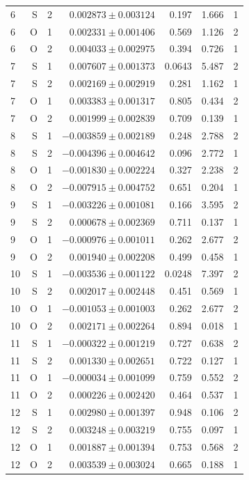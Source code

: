 {\begin{longtable}{lrrrrrr}
6 & S & 2 & $0.002873\pm0.003124$ & 0.197 & 1.666 & 1\\
6 & O & 1 & $0.002331\pm0.001406$ & 0.569 & 1.126 & 2\\
6 & O & 2 & $0.004033\pm0.002975$ & 0.394 & 0.726 & 1\\
7 & S & 1 & $0.007607\pm0.001373$ & 0.0643 & 5.487 & 2\\
7 & S & 2 & $0.002169\pm0.002919$ & 0.281 & 1.162 & 1\\
7 & O & 1 & $0.003383\pm0.001317$ & 0.805 & 0.434 & 2\\
7 & O & 2 & $0.001999\pm0.002839$ & 0.709 & 0.139 & 1\\
8 & S & 1 & $-0.003859\pm0.002189$ & 0.248 & 2.788 & 2\\
8 & S & 2 & $-0.004396\pm0.004642$ & 0.096 & 2.772 & 1\\
8 & O & 1 & $-0.001830\pm0.002224$ & 0.327 & 2.238 & 2\\
8 & O & 2 & $-0.007915\pm0.004752$ & 0.651 & 0.204 & 1\\
9 & S & 1 & $-0.003226\pm0.001081$ & 0.166 & 3.595 & 2\\
9 & S & 2 & $0.000678\pm0.002369$ & 0.711 & 0.137 & 1\\
9 & O & 1 & $-0.000976\pm0.001011$ & 0.262 & 2.677 & 2\\
9 & O & 2 & $0.001940\pm0.002208$ & 0.499 & 0.458 & 1\\
10 & S & 1 & $-0.003536\pm0.001122$ & 0.0248 & 7.397 & 2\\
10 & S & 2 & $0.002017\pm0.002448$ & 0.451 & 0.569 & 1\\
10 & O & 1 & $-0.001053\pm0.001003$ & 0.262 & 2.677 & 2\\
10 & O & 2 & $0.002171\pm0.002264$ & 0.894 & 0.018 & 1\\
11 & S & 1 & $-0.000322\pm0.001219$ & 0.727 & 0.638 & 2\\
11 & S & 2 & $0.001330\pm0.002651$ & 0.722 & 0.127 & 1\\
11 & O & 1 & $-0.000034\pm0.001099$ & 0.759 & 0.552 & 2\\
11 & O & 2 & $0.000226\pm0.002420$ & 0.464 & 0.537 & 1\\
12 & S & 1 & $0.002980\pm0.001397$ & 0.948 & 0.106 & 2\\
12 & S & 2 & $0.003248\pm0.003219$ & 0.755 & 0.097 & 1\\
12 & O & 1 & $0.001887\pm0.001394$ & 0.753 & 0.568 & 2\\
12 & O & 2 & $0.003539\pm0.003024$ & 0.665 & 0.188 & 1\\

\end{longtable}}
